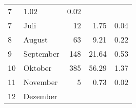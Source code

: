 \begin{longtable}{lXrrr}
       \num{7} &
       \num[round-mode=places,round-precision=2]{1.02} &
         \num[round-mode=places,round-precision=2]{0.02} \\

     7 &
     \multicolumn{1}{X}{ Juli   } &


       \num{12} &
       \num[round-mode=places,round-precision=2]{1.75} &
         \num[round-mode=places,round-precision=2]{0.04} \\

     8 &
     \multicolumn{1}{X}{ August   } &


       \num{63} &
       \num[round-mode=places,round-precision=2]{9.21} &
         \num[round-mode=places,round-precision=2]{0.22} \\

     9 &
     \multicolumn{1}{X}{ September   } &


       \num{148} &
       \num[round-mode=places,round-precision=2]{21.64} &
         \num[round-mode=places,round-precision=2]{0.53} \\

     10 &
     \multicolumn{1}{X}{ Oktober   } &


       \num{385} &
       \num[round-mode=places,round-precision=2]{56.29} &
         \num[round-mode=places,round-precision=2]{1.37} \\

     11 &
     \multicolumn{1}{X}{ November   } &


       \num{5} &
       \num[round-mode=places,round-precision=2]{0.73} &
         \num[round-mode=places,round-precision=2]{0.02} \\

     12 &
     \multicolumn{1}{X}{ Dezember   } &



\end{longtable}
